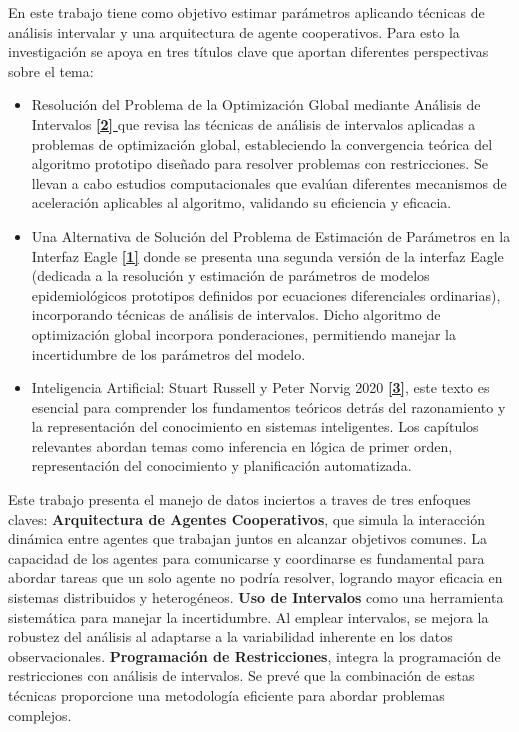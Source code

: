 En este trabajo tiene como objetivo estimar parámetros aplicando técnicas de análisis intervalar y una arquitectura de agente cooperativos. Para esto la investigación se apoya en tres títulos clave que aportan diferentes perspectivas sobre el tema:
\begin{itemize}
\item Resolución del Problema de la Optimización Global mediante Análisis de Intervalos \hyperref[sec:2]{ \textbf{[2] }} que revisa las técnicas de análisis de intervalos aplicadas a problemas de optimización global, estableciendo la convergencia teórica del algoritmo prototipo diseñado para resolver problemas con restricciones. Se llevan a cabo estudios computacionales que evalúan diferentes mecanismos de aceleración aplicables al algoritmo, validando su eficiencia y eficacia.

\item Una Alternativa de Solución del Problema de Estimación de Parámetros en la Interfaz Eagle \hyperref[sec:1]{ \textbf{ [1]}} donde se presenta una segunda versión de la interfaz Eagle (dedicada a la resolución y estimación de parámetros de modelos epidemiológicos prototipos definidos por ecuaciones diferenciales ordinarias), incorporando técnicas de análisis de intervalos. Dicho algoritmo de optimización global incorpora ponderaciones, permitiendo manejar la incertidumbre de los parámetros del modelo.

\item Inteligencia Artificial: Stuart Russell y Peter Norvig 2020 \hyperref[sec:3]{ \textbf{[3]}}, este texto es esencial para comprender los fundamentos teóricos detrás del razonamiento y la representación del conocimiento en sistemas inteligentes. Los capítulos relevantes abordan temas como inferencia en lógica de primer orden, representación del conocimiento y planificación automatizada.

\end{itemize}

Este trabajo presenta el manejo de datos inciertos a traves de tres enfoques claves: \textbf{Arquitectura de Agentes Cooperativos}, que simula la interacción dinámica entre agentes que trabajan juntos en alcanzar objetivos comunes. La capacidad de los agentes para comunicarse y coordinarse es fundamental para abordar tareas que un solo agente no podría resolver, logrando mayor eficacia en sistemas distribuidos y heterogéneos. \textbf{Uso de Intervalos} como una herramienta sistemática para manejar la incertidumbre. Al emplear intervalos, se mejora la robustez del análisis al adaptarse a la variabilidad inherente en los datos observacionales. \textbf{Programación de Restricciones}, integra la programación de restricciones con análisis de intervalos. Se prevé que la combinación de estas técnicas proporcione una metodología eficiente para abordar problemas complejos.

